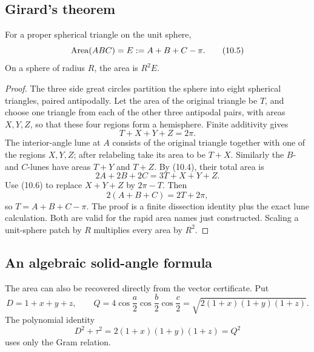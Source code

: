 \subsection{Girard's theorem}

\begin{theorem}
\label{thm:girard}
For a proper spherical triangle on the unit sphere,
\begin{equation}
 \operatorname{Area}(ABC)=E:=A+B+C-\pi.                                  \tag{10.5}
\end{equation}
On a sphere of radius \(R\), the area is \(R^2E\).
\end{theorem}

\begin{proof}
The three side great circles partition the sphere into eight spherical
triangles, paired antipodally.  Let the area of the original triangle be
\(T\), and choose one triangle from each of the other three antipodal pairs,
with areas \(X,Y,Z\), so that these four regions form a hemisphere.  Finite
additivity gives
\begin{equation}
 T+X+Y+Z=2\pi.                                              \tag{10.6}
\end{equation}
The interior-angle lune at \(A\) consists of the original triangle together
with one of the regions \(X,Y,Z\); after relabeling take its area to be
\(T+X\).  Similarly the \(B\)- and \(C\)-lunes have areas \(T+Y\) and
\(T+Z\).  By (10.4), their total area is
\begin{equation}
 2A+2B+2C=3T+X+Y+Z.                                        \tag{10.7}
\end{equation}
Use (10.6) to replace \(X+Y+Z\) by \(2\pi-T\).  Then
\[
 2(A+B+C)=2T+2\pi,
\]
so \(T=A+B+C-\pi\).  The proof is a finite dissection identity plus the exact
lune calculation.  Both are valid for the rapid area names just constructed.
Scaling a unit-sphere patch by \(R\) multiplies every area by \(R^2\).
\end{proof}

\subsection{An algebraic solid-angle formula}

The area can also be recovered directly from the vector certificate.  Put
\begin{equation}
 D=1+x+y+z,
 \qquad
 Q=4\cos\frac a2\cos\frac b2\cos\frac c2
   =\sqrt{2(1+x)(1+y)(1+z)}.                               \tag{10.8}
\end{equation}
The polynomial identity
\begin{equation}
 D^2+\tau^2=2(1+x)(1+y)(1+z)=Q^2                          \tag{10.9}
\end{equation}
uses only the Gram relation.

